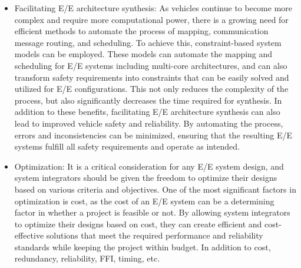 \begin{itemize}
    \item Facilitating E/E architecture synthesis: %
    As vehicles continue to become more complex and require more computational power, there is a growing need for efficient methods to automate the process of mapping, communication message routing, and scheduling.
    To achieve this, constraint-based system models can be employed. These models can automate the mapping and scheduling for E/E systems including multi-core architectures, and can also transform safety requirements into constraints that can be easily solved and utilized for E/E configurations. This not only reduces the complexity of the process, but also significantly decreases the time required for synthesis. In addition to these benefits, facilitating E/E architecture synthesis can also lead to improved vehicle safety and reliability. By automating the process, errors and inconsistencies can be minimized, ensuring that the resulting E/E systems fulfill all safety requirements and operate as intended.
    
    
    
    


    
    \item Optimization: %
    It is a critical consideration for any E/E system design, and system integrators should be given the freedom to optimize their designs based on various criteria and objectives. One of the most significant factors in optimization is cost, as the cost of an E/E system can be a determining factor in whether a project is feasible or not. By allowing system integrators to optimize their designs based on cost, they can create efficient and cost-effective solutions that meet the required performance and reliability standards while keeping the project within budget.
    In addition to cost, redundancy, reliability, FFI, timing, etc.  
    

\end{itemize}

